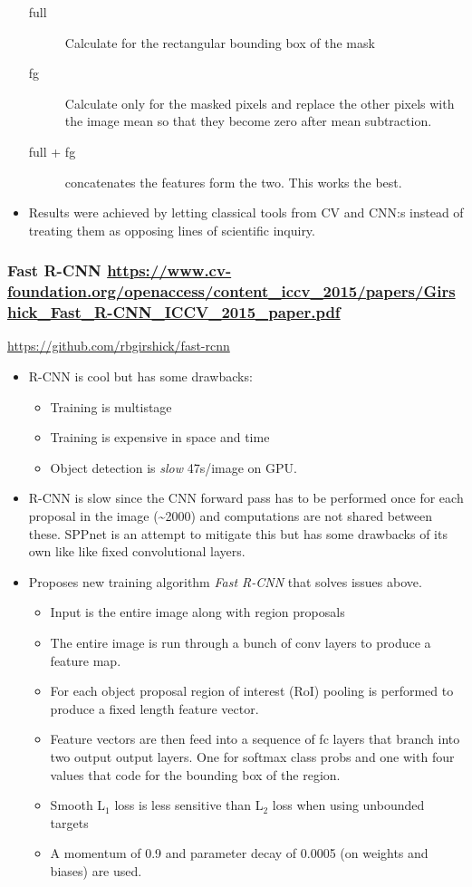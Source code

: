 \documentclass[11pt]{article}
\begin{document}
\begin{itemize}
\begin{description}
\item[{full}] Calculate for the rectangular bounding box of the mask
\item[{fg}] Calculate only for the masked pixels and replace the other pixels with the image mean so that they become zero after mean subtraction.
\item[{full + fg}] concatenates the features form the two. This works the best.
\end{description}
\item Results were achieved by letting classical tools from CV and CNN:s instead of treating them as opposing lines of scientific inquiry.
\end{itemize}


\subsubsection{Fast R-CNN \url{https://www.cv-foundation.org/openaccess/content\_iccv\_2015/papers/Girshick\_Fast\_R-CNN\_ICCV\_2015\_paper.pdf}}
\label{sec:orge2e7028}
\url{https://github.com/rbgirshick/fast-rcnn}

\begin{itemize}
\item R-CNN is cool but has some drawbacks:
\begin{itemize}
\item Training is multistage
\item Training is expensive in space and time
\item Object detection is \emph{slow} 47s/image on GPU.
\end{itemize}
\item R-CNN is slow since the CNN forward pass has to be performed once for each proposal in the image (\textasciitilde{}2000) and computations are not shared between these. SPPnet is an attempt to mitigate this but has some drawbacks of its own like like fixed convolutional layers.
\item Proposes new training algorithm \emph{Fast R-CNN} that solves issues above.
\begin{itemize}
\item Input is the entire image along with region proposals
\item The entire image is run through a bunch of conv layers to produce a feature map.
\item For each object proposal region of interest (RoI) pooling is performed to produce a fixed length feature vector.
\item Feature vectors are then feed into a sequence of fc layers that branch into two output output layers. One for softmax class probs and one with four values that code for the bounding box of the region.
\item Smooth L\(_{\text{1}}\) loss is less sensitive than L\(_{\text{2}}\) loss when using unbounded targets
\item A momentum of 0.9 and parameter decay of 0.0005 (on weights and biases) are used.
\end{itemize}
\end{itemize}
\end{document}
